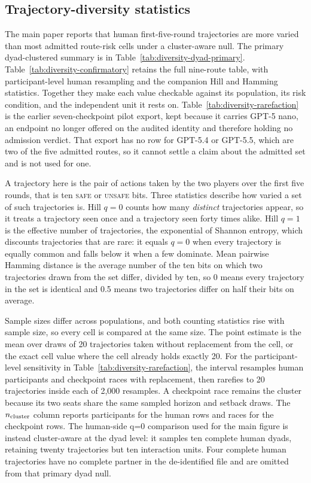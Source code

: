\documentclass[sigconf,anonymous]{aamas}
\newcommand{\Safe}{\textsc{safe}}
\newcommand{\Unsafe}{\textsc{unsafe}}
\begin{document}
\subsection{Trajectory-diversity statistics}
\label{app:diversity}

The main paper reports that human first-five-round trajectories are more
varied than most admitted route-risk cells under a cluster-aware null. The
primary dyad-clustered summary is in Table~\ref{tab:diversity-dyad-primary}.
Table~\ref{tab:diversity-confirmatory} retains the full nine-route table, with
participant-level human resampling and the companion Hill and Hamming
statistics. Together they make each value checkable against its population,
its risk condition, and the independent unit it rests on.
Table~\ref{tab:diversity-rarefaction} is the earlier seven-checkpoint pilot
export, kept because it carries GPT-5 nano, an endpoint no longer offered on
the audited identity and therefore holding no admission verdict. That export
has no row for GPT-5.4 or GPT-5.5, which are two of the five admitted routes,
so it cannot settle a claim about the admitted set and is not used for one.

A trajectory here is the pair of actions taken by the two players over the
first five rounds, that is ten \Safe{} or \Unsafe{} bits. Three statistics
describe how varied a set of such trajectories is. Hill $q = 0$ counts how
many \emph{distinct} trajectories appear, so it treats a trajectory seen once
and a trajectory seen forty times alike. Hill $q = 1$ is the effective number
of trajectories, the exponential of Shannon entropy, which discounts
trajectories that are rare: it equals $q = 0$ when every trajectory is equally
common and falls below it when a few dominate. Mean pairwise Hamming distance
is the average number of the ten bits on which two trajectories drawn from the
set differ, divided by ten, so 0 means every trajectory in the set is
identical and 0.5 means two trajectories differ on half their bits on average.

Sample sizes differ across populations, and both counting statistics rise with
sample size, so every cell is compared at the same size. The point estimate is
the mean over draws of 20 trajectories taken without replacement from the
cell, or the exact cell value where the cell already holds exactly 20. For the
participant-level sensitivity in Table~\ref{tab:diversity-rarefaction}, the
interval resamples human participants and checkpoint races with replacement,
then rarefies to 20 trajectories inside each of 2{,}000 resamples. A checkpoint
race remains the cluster because its two seats share the same sampled horizon
and setback draws. The $n_{\rm cluster}$ column reports participants for the
human rows and races for the checkpoint rows. The human-side q=0 comparison
used for the main figure is instead cluster-aware at the dyad level: it samples ten
complete human dyads, retaining twenty trajectories but ten interaction units.
Four complete human trajectories have no complete partner in the de-identified
file and are omitted from that primary dyad null.
\end{document}
